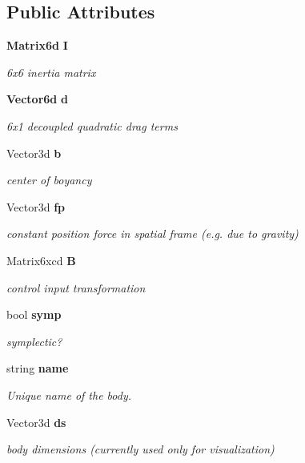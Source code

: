 \subsection*{\-Public \-Attributes}
\begin{DoxyCompactItemize}
\item 
{\bf \-Matrix6d} {\bf \-I}
\begin{DoxyCompactList}\small\item\em 6x6 inertia matrix \end{DoxyCompactList}\item 
{\bf \-Vector6d} {\bf d}
\begin{DoxyCompactList}\small\item\em 6x1 decoupled quadratic drag terms \end{DoxyCompactList}\item 
\-Vector3d {\bf b}
\begin{DoxyCompactList}\small\item\em center of boyancy \end{DoxyCompactList}\item 
\-Vector3d {\bf fp}
\begin{DoxyCompactList}\small\item\em constant position force in spatial frame (e.\-g. due to gravity) \end{DoxyCompactList}\item 
\-Matrix6xcd {\bf \-B}
\begin{DoxyCompactList}\small\item\em control input transformation \end{DoxyCompactList}\item 
bool {\bf symp}
\begin{DoxyCompactList}\small\item\em symplectic? \end{DoxyCompactList}\item 
string {\bf name}
\begin{DoxyCompactList}\small\item\em \-Unique name of the body. \end{DoxyCompactList}\item 
\-Vector3d {\bf ds}
\begin{DoxyCompactList}\small\item\em body dimensions (currently used only for visualization) \end{DoxyCompactList}\end{DoxyCompactItemize}


